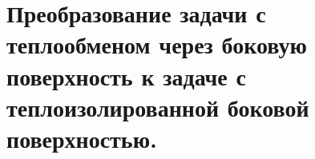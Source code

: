 \chapter{Преобразование задачи с теплообменом через боковую поверхность к задаче
с теплоизолированной боковой поверхностью.}

\newpage
